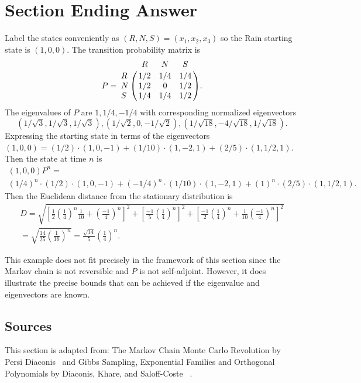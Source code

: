 \documentclass[12pt]{article}
\begin{document}
\section*{Section Ending Answer}

Label the states conveniently as \( (R, N, S) = (x_1, x_2, x_3) \) so
the Rain starting state is \( (1,0,0) \).  The transition probability
matrix is
\[
    P = \bordermatrix{ & R & N & S \cr
    R & 1/2 & 1/4 & 1/4 \cr
    N & 1/2 & 0 & 1/2 \cr
    S & 1/4 & 1/4 & 1/2 }.
\] The eigenvalues of \( P \) are \( 1, 1/4, -1/4 \) with corresponding
normalized eigenvectors
\[
    (1/\sqrt{3}, 1/\sqrt{3}, 1/\sqrt{3}), (1/\sqrt {2}, 0, -1/\sqrt{2}),
    (1/\sqrt{18}, -4/\sqrt{18}, 1/\sqrt{18}).
\] Expressing the starting state in terms of the eigenvectors \( (1,0,0)
= (1/2) \cdot (1,0,-1) + (1/10) \cdot (1, -2, 1) + (2/5) \cdot (1, 1/2,
1) \).  Then the state at time \( n \) is
\begin{multline*}
    (1,0,0)P^n = \\
    (1/4)^n \cdot (1/2) \cdot (1,0,-1) + (-1/4)^n \cdot (1/10) \cdot (1,
    -2, 1) + (1)^n \cdot (2/5) \cdot (1, 1/2, 1).
\end{multline*}
Then the Euclidean distance from the stationary distribution is
\begin{multline*}
    D = \sqrt{ \left[\frac{1}{2} \left(\frac{1}{4} \right)^n \frac{1}{10}
    + \left(\frac{-1}{4} \right)^n \right]^{2} +\left[\frac{-1}{5} \left
    (\frac {1}{4} \right)^n \right]^{2} + \left[\frac{-1}{2} \left(\frac
    {1}{4} \right)^n + \frac{1}{10} \left(\frac{-1}{4} \right)^n \right]^
    {2} } \\
    =\sqrt{ \frac{14}{25} \left( \frac{1}{16} \right)^n} = \frac{\sqrt{14}}
    {5} \left( \frac{1}{4} \right)^{n}.
\end{multline*}

This example does not fit precisely in the framework of this section
since the Markov chain is not reversible and \( P \) is not
self-adjoint.  However, it does illustrate the precise bounds that can
be achieved if the eigenvalue and eigenvectors are known.

\subsection*{Sources} This section is adapted from:  The Markov Chain
Monte Carlo Revolution by Persi Diaconis~%
\cite{diaconis09} and Gibbs Sampling, Exponential Families and
Orthogonal Polynomials by Diaconis, Khare, and Saloff-Coste~%
\cite{diaconis08}.
\end{document}
